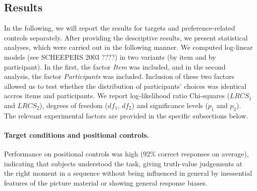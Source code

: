 \documentclass[fleqn,reqno,10pt,draft]{article}
\begin{document}
\subsection{Results}
\label{sec:results}

In the following, we will report the results for targets and
preference-related controls separately. After providing the
descriptive results, we present statistical analyses, which were
carried out in the following manner.  We computed log-linear models
(see SCHEEPERS 2003 ????) in two variants (by item and by participant). In
the first, the factor {\it Item} was included, and in the second
analysis, the factor {\it Participants} was included. Inclusion of
these two factors allowed us to test whether the distribution of
participants' choices was identical accros items and participants. We
report log-likelihood ratio Chi-squares ($LRCS_1$ and $LRCS_2$),
degrees of freedom ($df_1$, $df_2$) and significance levels ($p_1$ and
$p_2$). The relevant experimental factors are provided in the specific
subsections below.

\paragraph{Target conditions and positional controls.}
Performance on positional controls was high (92\% correct responses on
average), indicating that subjects understood the task, giving
truth-value judgements at the right moment in a sequence without being
influenced in general by inessential features of the picture material
or showing general response biases.
\end{document}
